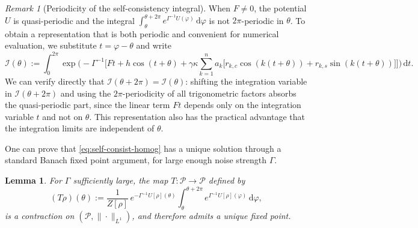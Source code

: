 \documentclass[a4paper,11pt]{article}
\theoremstyle{plain}
\newtheorem{lem}[thm]{Lemma}
\theoremstyle{definition}
\theoremstyle{remark}
\newtheorem{rem}[thm]{Remark}
\newcommand{\dd}{\,\mathrm{d}}
\newcommand{\cI}{\mathcal{I}}
\begin{document}
\begin{rem}[Periodicity of the self-consistency integral]\label{rem:periodicity}
When $F \neq 0$, the potential $U$ is quasi-periodic and the integral $\int_\theta^{\theta+2\pi} e^{\Gamma^{-1} U(\varphi)}\dd\varphi$ is not $2\pi$-periodic in $\theta$. To obtain a representation that is both periodic and convenient for numerical evaluation, we substitute $t = \varphi - \theta$ and write
\begin{equation}\label{eq:calI}
    \cI(\theta) := \int_0^{2\pi} \exp\bigg(-\Gamma^{-1}\bigg[Ft + h\cos(t+\theta) + \gamma\kappa\sum_{k=1}^n a_k\big[r_{k,c}\cos(k(t+\theta)) + r_{k,s}\sin(k(t+\theta))\big]\bigg]\bigg)\dd t.
\end{equation}
We can verify directly that $\cI(\theta + 2\pi) = \cI(\theta)$: shifting the integration variable in $\cI(\theta + 2\pi)$ and using the $2\pi$-periodicity of all trigonometric factors absorbs the quasi-periodic part, since the linear term $Ft$ depends only on the integration variable $t$ and not on $\theta$. This representation also has the practical advantage that the integration limits are independent of $\theta$.
\end{rem}

One can prove that \eqref{eq:self-consist-homog} has a unique solution through a standard Banach fixed point argument, for large enough noise strength $\Gamma$.

\begin{lem}\label{lem:uniqueness-homog}
For $\Gamma$ sufficiently large, the map $T:\mathcal{P}\to\mathcal{P}$ defined by
\[
    (T\rho)(\theta) := \frac{1}{Z[\rho]}\,e^{-\Gamma^{-1} U[\rho](\theta)} \int_\theta^{\theta + 2\pi} e^{\Gamma^{-1} U[\rho](\varphi)}\,\mathrm{d}\varphi,
\]
is a contraction on $(\mathcal{P}, \|\cdot\|_{L^1})$, and therefore admits a unique fixed point.
\end{lem}
\end{document}
